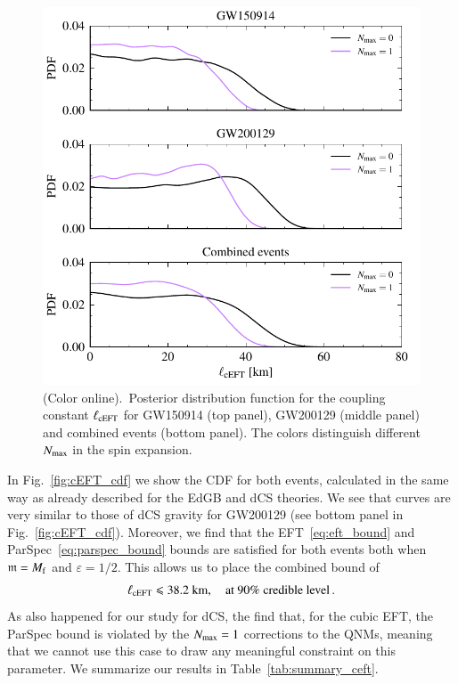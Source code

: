 \documentclass[twocolumn,
               prd,
               aps,
               superscriptaddress,
               tightenlines,
               nofootinbib,
               eqsecnum,
               amsfonts,
               amsmath,
               longbibliography]{revtex4-1}
\begin{document}
\begin{figure}[t]
\includegraphics[width=\columnwidth]{figs/ceft_posteriors_combined.pdf}
\caption{(Color online).~Posterior distribution function for the coupling constant $\ell_{\rm cEFT}$ for
GW150914 (top panel), GW200129 (middle panel) and combined events (bottom panel).
%
The colors distinguish different $N_{\rm max}$ in the spin expansion.
}
\label{fig:cEFT_exec_sum}
\end{figure}

In Fig.~\ref{fig:cEFT_cdf} we show the CDF for both events, calculated in the
same way as already described for the EdGB and dCS theories.
%
We see that curves are very similar to those of dCS gravity for GW200129 (see
bottom panel in Fig.~\ref{fig:cEFT_cdf}).
%
Moreover, we find that the EFT~\eqref{eq:eft_bound} and
ParSpec~\eqref{eq:parspec_bound} bounds are satisfied for both events both when
$\mathfrak{m} = M_{\rm f}$ and $\varepsilon = 1/2$.
%
This allows us to place the combined bound of
%
\begin{equation}
    \ell_{\rm cEFT} \leqslant 38.2~\textrm{km}, \quad \textrm{at 90\% credible level}\,.
\end{equation}
%
As also happened for our study for dCS, the find that, for
the cubic EFT, the ParSpec bound is violated by the $N_{\rm max} = 1$ corrections to
the QNMs, meaning that we cannot use this case to draw any meaningful
constraint on this parameter.
%
We summarize our results in Table~\ref{tab:summary_ceft}.
\end{document}
